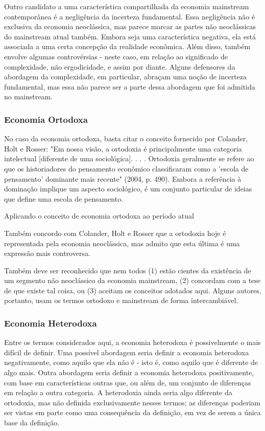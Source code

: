 \documentclass[a4paper,12pt]{article}[abntex2]
\begin{document}
Outro candidato a uma característica compartilhada da economia mainstream contemporânea é a negligência da incerteza fundamental. Essa negligência não é exclusiva da economia neoclássica, mas parece marcar as partes não neoclássicas do mainstream atual também. Embora seja uma característica negativa, ela está associada a uma certa concepção da realidade econômica. Além disso, também envolve algumas controvérsias - neste caso, em relação ao significado de complexidade, não ergodicidade, e assim por diante. Alguns defensores da abordagem da complexidade, em particular, abraçam uma noção de incerteza fundamental, mas essa não parece ser a parte dessa abordagem que foi admitida no mainstream.

\subsubsection{\textbf{Economia Ortodoxa}}

No caso da economia ortodoxa, basta citar o conceito fornecido por Colander, Holt e Rosser: "Em nossa visão, a ortodoxia é principalmente uma categoria intelectual [diferente de uma sociológica]. . . . Ortodoxia geralmente se refere ao que os historiadores do pensamento econômico classificaram como a 'escola de pensamento' dominante mais recente" (2004, p. 490). Embora a referência à dominação implique um aspecto sociológico, é um conjunto particular de ideias que define uma escola de pensamento.

Aplicando o conceito de economia ortodoxa ao período atual

Também concordo com Colander, Holt e Rosser que a ortodoxia hoje é representada pela economia neoclássica, mas admito que esta última é uma expressão mais controversa.

Também deve ser reconhecido que nem todos (1) estão cientes da existência de um segmento não neoclássico da economia mainstream, (2) concordam com a tese de que existe tal coisa, ou (3) aceitam os conceitos adotados aqui. Alguns autores, portanto, usam os termos ortodoxo e mainstream de forma intercambiável.

\subsubsection{\textbf{Economia Heterodoxa}}

Entre os termos considerados aqui, a economia heterodoxa é possivelmente o mais difícil de definir. Uma possível abordagem seria definir a economia heterodoxa negativamente, como aquilo que ela não é - isto é, como aquilo que é diferente de algo mais. Outra abordagem seria definir a economia heterodoxa positivamente, com base em características outras que, ou além de, um conjunto de diferenças em relação a outra categoria. A heterodoxia ainda seria algo diferente da ortodoxia, mas não definida exclusivamente nesses termos; as diferenças poderiam ser vistas em parte como uma consequência da definição, em vez de serem a única base da definição.
\end{document}
